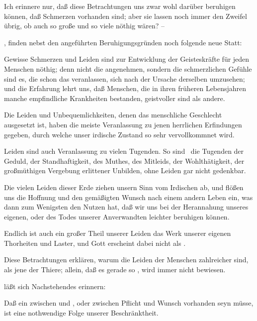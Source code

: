 \begin{aufza}
\begin{aufzb}
Ich erinnere nur, daß diese Betrachtungen uns zwar wohl darüber beruhigen können, daß Schmerzen  vorhanden sind; aber sie lassen noch immer den Zweifel übrig, ob auch so große und so viele nöthig wären? --
\item  {}, finden nebst den  angeführten Beruhigungsgründen noch folgende neue Statt:~
\begin{aufzc}
\item  Gewisse Schmerzen und Leiden sind zur Entwicklung der Geisteskräfte für jeden Menschen nöthig; denn nicht die angenehmen, sondern die schmerzlichen Gefühle sind es, die schon das  veranlassen, sich nach der Ursache derselben umzusehen; und die Erfahrung lehrt uns, daß Menschen, die in ihren früheren Lebensjahren manche empfindliche Krankheiten bestanden, geistvoller sind als andere.
\item  Die Leiden und Unbequemlichkeiten, denen das menschliche Geschlecht ausgesetzt ist, haben die meiste Veranlassung zu jenen herrlichen Erfindungen gegeben, durch welche unser irdische Zustand so sehr vervollkommnet wird.
\item  Leiden sind auch Veranlassung zu vielen Tugenden. So sind \zB\ die Tugenden der Geduld, der Standhaftigkeit, des Muthes, des Mitleids, der Wohlthätigkeit, der großmüthigen Vergebung erlittener Unbilden, ohne Leiden gar nicht gedenkbar.
\item  Die vielen Leiden dieser Erde ziehen unsern Sinn vom Irdischen ab, und flößen uns die Hoffnung und den gemäßigten Wunsch nach einem andern Leben ein, was dann zum Wenigsten den Nutzen hat, daß wir uns bei der Herannahung unseres eigenen, oder des Todes unserer Anverwandten leichter beruhigen können.
\item  Endlich ist auch ein großer Theil unserer Leiden das Werk unserer eigenen Thorheiten und Laster, und Gott erscheint dabei nicht als .
\end{aufzc}
Diese Betrachtungen erklären, warum die Leiden der Menschen zahlreicher sind, als jene der Thiere; allein, daß es gerade so , wird immer nicht bewiesen.
\item {} läßt sich Nachstehendes erinnern:
\begin{aufzc}
\item  Daß ein  zwischen  und , oder zwischen Pflicht und Wunsch vorhanden seyn müsse, ist eine nothwendige Folge unserer Beschränktheit.~

\end{aufzc}
\end{aufzb}
\end{aufza}

